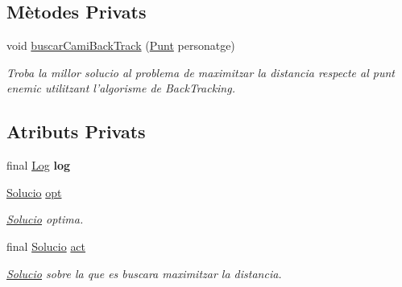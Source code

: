 \subsection*{Mètodes Privats}
\begin{DoxyCompactItemize}
\item 
void \hyperlink{classlogica_1_1algoritmica_1_1_back_tracking_1_1_buscador_cami_maxim_a407a2f222dbe4121fda40f5817f2f995}{buscar\+Cami\+Back\+Track} (\hyperlink{classlogica_1_1_punt}{Punt} personatge)
\begin{DoxyCompactList}\small\item\em Troba la millor solucio al problema de maximitzar la distancia respecte al punt enemic utilitzant l'algorisme de Back\+Tracking. \end{DoxyCompactList}\end{DoxyCompactItemize}
\subsection*{Atributs Privats}
\begin{DoxyCompactItemize}
\item 
\hypertarget{classlogica_1_1algoritmica_1_1_back_tracking_1_1_buscador_cami_maxim_af26e7e661468d5ce8d54283c45ab6702}{final \hyperlink{classlogica_1_1log_1_1_log}{Log} {\bfseries log}}\label{classlogica_1_1algoritmica_1_1_back_tracking_1_1_buscador_cami_maxim_af26e7e661468d5ce8d54283c45ab6702}

\item 
\hypertarget{classlogica_1_1algoritmica_1_1_back_tracking_1_1_buscador_cami_maxim_a553e2d1a2a45fc88eab631bee7ec38aa}{\hyperlink{classlogica_1_1algoritmica_1_1_back_tracking_1_1_solucio}{Solucio} \hyperlink{classlogica_1_1algoritmica_1_1_back_tracking_1_1_buscador_cami_maxim_a553e2d1a2a45fc88eab631bee7ec38aa}{opt}}\label{classlogica_1_1algoritmica_1_1_back_tracking_1_1_buscador_cami_maxim_a553e2d1a2a45fc88eab631bee7ec38aa}

\begin{DoxyCompactList}\small\item\em \hyperlink{classlogica_1_1algoritmica_1_1_back_tracking_1_1_solucio}{Solucio} optima. \end{DoxyCompactList}\item 
\hypertarget{classlogica_1_1algoritmica_1_1_back_tracking_1_1_buscador_cami_maxim_a96bcdeb2c28a4383c48cf6a0eaad90d1}{final \hyperlink{classlogica_1_1algoritmica_1_1_back_tracking_1_1_solucio}{Solucio} \hyperlink{classlogica_1_1algoritmica_1_1_back_tracking_1_1_buscador_cami_maxim_a96bcdeb2c28a4383c48cf6a0eaad90d1}{act}}\label{classlogica_1_1algoritmica_1_1_back_tracking_1_1_buscador_cami_maxim_a96bcdeb2c28a4383c48cf6a0eaad90d1}

\begin{DoxyCompactList}\small\item\em \hyperlink{classlogica_1_1algoritmica_1_1_back_tracking_1_1_solucio}{Solucio} sobre la que es buscara maximitzar la distancia. \end{DoxyCompactList}\end{DoxyCompactItemize}


